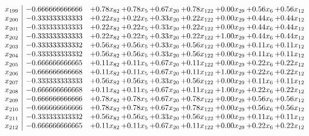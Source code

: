 \documentclass[8pt]{article}
\begin{document}
\[\begin{array}{c| c c@{\hskip 2pt} c@{\hskip 2pt} c@{\hskip 2pt} c@{\hskip 2pt} c@{\hskip 2pt} c@{\hskip 2pt} c@{\hskip 2pt} }
 x_{199}   &  -0.666666666666 & +  0.78 x_{82} & +  0.78 x_{5} & +  0.67 x_{20} & +  0.78 x_{122} & +  0.00 x_{29} & +  0.56 x_{6} & +  0.56 x_{12}\\
 x_{200}   &  -0.333333333333 & +  0.22 x_{82} & +  0.22 x_{5} & +  0.33 x_{20} & +  0.22 x_{122} & +  0.00 x_{29} & +  0.44 x_{6} & +  0.44 x_{12}\\
 x_{201}   &  -0.333333333333 & +  0.22 x_{82} & +  0.22 x_{5} & +  0.33 x_{20} & +  0.22 x_{122} & +  0.00 x_{29} & +  0.44 x_{6} & +  0.44 x_{12}\\
 x_{202}   &  -0.333333333333 & +  0.22 x_{82} & +  0.22 x_{5} & +  0.33 x_{20} & +  0.22 x_{122} & +  1.00 x_{29} & +  0.44 x_{6} & +  0.44 x_{12}\\
 x_{203}   &  -0.333333333332 & +  0.56 x_{82} & +  0.56 x_{5} & +  0.33 x_{20} & +  0.56 x_{122} & +  0.00 x_{29} & +  0.11 x_{6} & +  0.11 x_{12}\\
 x_{204}   &  -0.333333333332 & +  0.56 x_{82} & +  0.56 x_{5} & +  0.33 x_{20} & +  0.56 x_{122} & +  0.00 x_{29} & +  0.11 x_{6} & +  0.11 x_{12}\\
 x_{205}   &  -0.666666666665 & +  0.11 x_{82} & +  0.11 x_{5} & +  0.67 x_{20} & +  0.11 x_{122} & +  0.00 x_{29} & +  0.22 x_{6} & +  0.22 x_{12}\\
 x_{206}   &  -0.666666666668 & +  0.11 x_{82} & +  0.11 x_{5} & +  0.67 x_{20} & +  0.11 x_{122} & +  1.00 x_{29} & +  0.22 x_{6} & +  0.22 x_{12}\\
 x_{207}   &  -0.333333333333 & +  0.56 x_{82} & +  0.56 x_{5} & +  0.33 x_{20} & +  0.56 x_{122} & +  0.00 x_{29} & +  0.11 x_{6} & +  0.11 x_{12}\\
 x_{208}   &  -0.666666666668 & +  0.11 x_{82} & +  0.11 x_{5} & +  0.67 x_{20} & +  0.11 x_{122} & +  1.00 x_{29} & +  0.22 x_{6} & +  0.22 x_{12}\\
 x_{209}   &  -0.666666666666 & +  0.78 x_{82} & +  0.78 x_{5} & +  0.67 x_{20} & +  0.78 x_{122} & +  0.00 x_{29} & +  0.56 x_{6} & +  0.56 x_{12}\\
 x_{210}   &  -0.666666666666 & +  0.78 x_{82} & +  0.78 x_{5} & +  0.67 x_{20} & +  0.78 x_{122} & +  0.00 x_{29} & +  0.56 x_{6} & +  0.56 x_{12}\\
 x_{211}   &  -0.333333333332 & +  0.56 x_{82} & +  0.56 x_{5} & +  0.33 x_{20} & +  0.56 x_{122} & +  0.00 x_{29} & +  0.11 x_{6} & +  0.11 x_{12}\\
 x_{212}   &  -0.666666666665 & +  0.11 x_{82} & +  0.11 x_{5} & +  0.67 x_{20} & +  0.11 x_{122} & +  0.00 x_{29} & +  0.22 x_{6} & +  0.22 x_{12}\\

\end{array}\]
\end{document}
